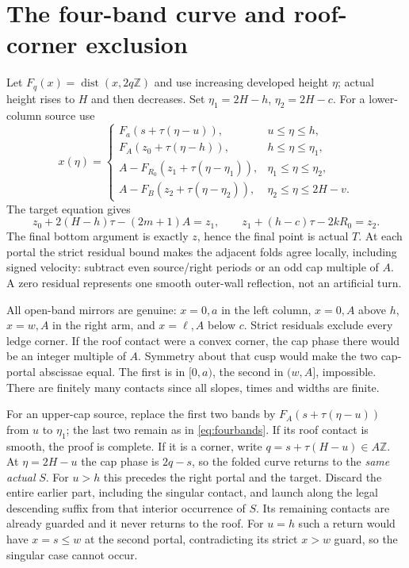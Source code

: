 \documentclass[11pt]{article}
\theoremstyle{definition}
\newcommand{\Z}{\mathbb Z}
\newcommand{\dist}{\operatorname{dist}}
\begin{document}
\section{The four-band curve and roof-corner exclusion}
Let $F_q(x)=\dist(x,2q\Z)$ and use increasing developed height $\eta$; actual height rises to $H$ and then decreases. Set $\eta_1=2H-h$, $\eta_2=2H-c$.
For a lower-column source use
\begin{equation}\label{eq:fourbands}
 x(\eta)=\begin{cases}
 F_a(s+\tau(\eta-u)),&u\le\eta\le h,\\
 F_A(z_0+\tau(\eta-h)),&h\le\eta\le\eta_1,\\
 A-F_{R_0}(z_1+\tau(\eta-\eta_1)),&\eta_1\le\eta\le\eta_2,\\
 A-F_B(z_2+\tau(\eta-\eta_2)),&\eta_2\le\eta\le2H-v.
 \end{cases}
\end{equation}
The target equation gives
\[
 z_0+2(H-h)\tau-(2m+1)A=z_1,\qquad
 z_1+(h-c)\tau-2kR_0=z_2.
\]
The final bottom argument is exactly $z$, hence the final point is actual $T$.
At each portal the strict residual bound makes the adjacent folds agree locally, including signed velocity: subtract even source/right periods or an odd cap multiple of $A$. A zero residual represents one smooth outer-wall reflection, not an artificial turn.

All open-band mirrors are genuine: $x=0,a$ in the left column, $x=0,A$ above $h$, $x=w,A$ in the right arm, and $x=\ell,A$ below $c$. Strict residuals exclude every ledge corner. If the roof contact were a convex corner, the cap phase there would be an integer multiple of $A$. Symmetry about that cusp would make the two cap-portal abscissae equal. The first is in $[0,a)$, the second in $(w,A]$, impossible. There are finitely many contacts since all slopes, times and widths are finite.

For an upper-cap source, replace the first two bands by $F_A(s+\tau(\eta-u))$ from $u$ to $\eta_1$; the last two remain as in \eqref{eq:fourbands}. If its roof contact is smooth, the proof is complete. If it is a corner, write $q=s+\tau(H-u)\in A\Z$. At $\eta=2H-u$ the cap phase is $2q-s$, so the folded curve returns to the \emph{same actual} $S$. For $u>h$ this precedes the right portal and the target. Discard the entire earlier part, including the singular contact, and launch along the legal descending suffix from that interior occurrence of $S$. Its remaining contacts are already guarded and it never returns to the roof. For $u=h$ such a return would have $x=s\le w$ at the second portal, contradicting its strict $x>w$ guard, so the singular case cannot occur.
\end{document}
